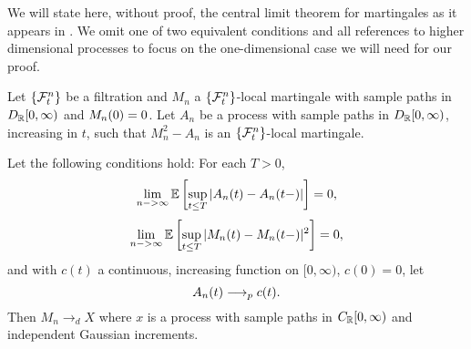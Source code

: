 We will state here, without proof, the central limit theorem for martingales as it appears in \cite[p. 339 f.]{N.Ethier1986}.
We omit one of two equivalent conditions and all references to higher dimensional processes to focus on the one-dimensional case we will need for our proof.

\begin{theorem} \label{T: functional CLT martingales}
	Let $\{\mathcal{F}^n_{t}\}$ be a filtration and $M_n$ a $\{\mathcal{F}^n_{t}\}$-local martingale with sample paths in $D_{\mathbb{R}}[0,\infty)$ and $M_n(0)=0$.
	Let $A_n$ be a process with sample paths in $D_{\mathbb{R}}[0,\infty)$, increasing in $t$, such that $M_n^2 - A_n$ is an $\{\mathcal{F}^n_{t}\}$-local martingale.
	
	Let the following conditions hold:
	For each $T>0$,
	\begin{equation}
	\lim_{n->\infty} \mathbb{E} \left[ 
	\sup_{t \leq T} | A_n(t) - A_n(t-)|
     \right] = 0,
	\end{equation}
	\begin{equation}
	\lim_{n->\infty} \mathbb{E} \left[ 
		\sup_{t \leq T} | M_n(t) - M_n(t-)|^2
	 \right] = 0,
	\end{equation}
	and with $c(t)$ a continuous, increasing function on $[0, \infty)$, $c(0) = 0$, let
	\begin{equation}
	A_n(t) \longrightarrow_p c(t).
	\end{equation}
	Then $M_n \longrightarrow_d X$ where $x$ is a process with sample paths in $C_{\mathbb{R}}[0,\infty)$ and independent Gaussian increments.
\end{theorem}













